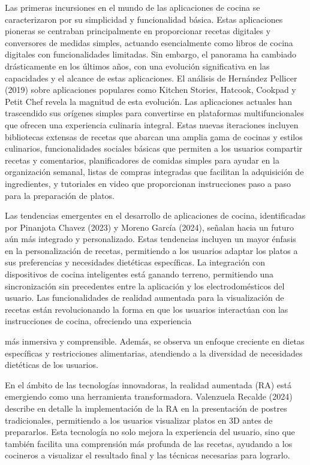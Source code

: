 \documentclass[a4paper,12pt]{article}
\begin{document}
Las primeras incursiones en el mundo de las aplicaciones de cocina se caracterizaron por su simplicidad y funcionalidad básica. Estas aplicaciones pioneras se centraban principalmente en proporcionar recetas digitales y conversores de medidas simples, actuando esencialmente como libros de cocina digitales con funcionalidades limitadas. Sin embargo, el panorama ha cambiado drásticamente en los últimos años, con una evolución significativa en las capacidades y el alcance de estas aplicaciones.
El análisis de Hernández Pellicer (2019) sobre aplicaciones populares como Kitchen Stories, Hatcook, Cookpad y Petit Chef revela la magnitud de esta evolución. Las aplicaciones actuales han trascendido sus orígenes simples para convertirse en plataformas multifuncionales que ofrecen una experiencia culinaria integral. Estas nuevas iteraciones incluyen bibliotecas extensas de recetas que abarcan una amplia gama de cocinas y estilos culinarios, funcionalidades sociales básicas que permiten a los usuarios compartir recetas y comentarios, planificadores de comidas simples para ayudar en la organización semanal, listas de compras integradas que facilitan la adquisición de ingredientes, y tutoriales en video que proporcionan instrucciones paso a paso para la preparación de platos.

Las tendencias emergentes en el desarrollo de aplicaciones de cocina, identificadas por Pinanjota Chavez (2023) y Moreno García (2024), señalan hacia un futuro aún más integrado y personalizado. Estas tendencias incluyen un mayor énfasis en la personalización de recetas, permitiendo a los usuarios adaptar los platos a sus preferencias y necesidades dietéticas específicas. La integración con dispositivos de cocina inteligentes está ganando terreno, permitiendo una sincronización sin precedentes entre la aplicación y los electrodomésticos del usuario. Las funcionalidades de realidad aumentada para la visualización de recetas están revolucionando la forma en que los usuarios interactúan con las instrucciones de cocina, ofreciendo una experiencia
 
más inmersiva y comprensible. Además, se observa un enfoque creciente en dietas específicas y restricciones alimentarias, atendiendo a la diversidad de necesidades dietéticas de los usuarios.

En el ámbito de las tecnologías innovadoras, la realidad aumentada (RA) está emergiendo como una herramienta transformadora. Valenzuela Recalde (2024) describe en detalle la implementación de la RA en la presentación de postres tradicionales, permitiendo a los usuarios visualizar platos en 3D antes de prepararlos. Esta tecnología no solo mejora la experiencia del usuario, sino que también facilita una comprensión más profunda de las recetas, ayudando a los cocineros a visualizar el resultado final y las técnicas necesarias para lograrlo.
\end{document}
